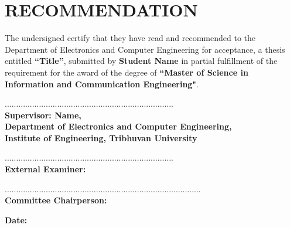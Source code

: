 \chapter*{RECOMMENDATION}
The undersigned certify that they have read and recommended to the Department of
Electronics and Computer Engineering for acceptance, a thesis entitled \textbf{``Title''}, submitted by \textbf{Student Name} in partial fulfillment of the requirement for
the award of the degree of \textbf{``Master of Science in Information and Communication Engineering"}.\par
\vspace{1.5cm}
..........................................................................\\
\textbf{Supervisor: Name,\\Department of Electronics and Computer Engineering,\\Institute of Engineering, Tribhuvan University}\par
\vspace{1.5cm}
..........................................................................\\
\textbf{External Examiner:  }

\vspace{1.5cm}
......................................................................................\\
\textbf{Committee Chairperson:  }

\vspace{0.8cm}
\textbf{Date: }

\newpage
